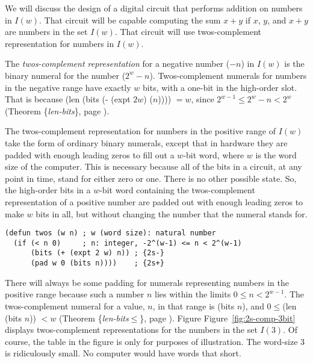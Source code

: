 We will discuss the design of a digital circuit that
performs addition on numbers in $I(w)$.
That circuit will be capable computing the sum $x+y$
if $x$, $y$, and $x+y$ are numbers in the set $I(w)$.
That circuit will use twos-complement
representation for numbers in $I(w)$.

\label{2s-def}
The \emph{twos-complement representation} for a negative number ($-n$) in $I(w)$
is the binary numeral for the number ($2^w-n$).
Twos-complement numerals for numbers in the negative range
have exactly $w$ bits, with a one-bit in the high-order slot.
That is because (len (bits (- (expt $2 w$) ($n$)))) $= w$,
since $2^{w-1} \le 2^w - n < 2^{w}$
(Theorem \{\emph{len-bits}\}, page \pageref{len-bits}).

The twos-complement representation for numbers in the positive range of $I(w)$
take the form of ordinary binary numerals, except that in
hardware they are padded with enough leading zeros
to fill out a $w$-bit word, where $w$ is the word size of the computer.
This is necessary because all of the bits in a circuit, at any point in time,
stand for either zero or one. There is no other possible state.
So, the high-order bits in a $w$-bit word containing the twos-complement
representation of a positive number are padded out with enough
leading zeros to make $w$ bits in all, but without changing the number
that the numeral stands for.

\label{twos-defun}
\begin{Verbatim}
(defun twos (w n) ; w (word size): natural number
  (if (< n 0)     ; n: integer, -2^(w-1) <= n < 2^(w-1)
      (bits (+ (expt 2 w) n)) ; {2s-}
      (pad w 0 (bits n))))    ; {2s+}
\end{Verbatim}

There will always be some padding for numerals representing
numbers in the positive range because such a number $n$
lies within the limits $0 \le n < 2^{w-1}$.
The twos-complement numeral for a value, $n$, in that range is (bits $n$),
and $0 \le $(len (bits $n$)) $< w$
(Theorem \{\emph{len-bits}$\le$\}, page \pageref{len-bitsLE}).
Figure Figure~\ref{fig:2s-comp-3bit} displays
twos-complement representations for the numbers in the set $I(3)$.
Of course, the table in the figure is only for purposes of illustration.
The word-size 3 is ridiculously small.
No computer would have words that short.


